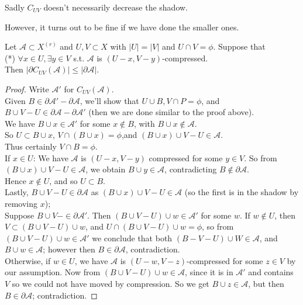 \documentclass[a4paper]{article}
\begin{document}
Sadly $C_{UV}$ doesn't necessarily decrease the shadow.

However, it turns out to be fine if we have done the smaller ones.

\begin{prop}
    Let $\mathcal{A} \subset X^{(r)}$ and $U,V \subset X$ with $|U|=|V|$ and $U \cap V = \phi$. Suppose that\\
    (*) $\forall x \in U, \exists y \in V$ s.t. $\mathcal{A}$ is $(U-x,V-y)$-compressed.\\
    Then $|\partial C_{UV}(\mathcal{A})|\leq |\partial \mathcal{A}|$.
    \begin{proof}
        Write $\mathcal{A}'$ for $C_{UV}(\mathcal{A})$.\\
        Given $B \in \partial \mathcal{A}' - \partial \mathcal{A}$, we'll show that $U \cup B, V \cap P = \phi$, and $B \cup V - U \in \partial \mathcal{A} - \partial \mathcal{A}'$ (then we are done similar to the proof above).\\
        We have $B \cup x \in \mathcal{A}'$ for some $x \not\in B$, with $B \cup x \not\in \mathcal{A}$.\\
        So $U \subset B \cup x$, $V \cap (B \cup x) = \phi$,and $(B \cup x) \cup V - U \in \mathcal{A}$.\\
        Thus certainly $V \cap B = \phi$.\\
        If $x \in U$: We have $\mathcal{A}$ is $(U-x,V-y)$ compressed for some $y \in V$. So from $(B \cup x) \cup V - U \in \mathcal{A}$, we obtain $B \cup y \in \mathcal{A}$, contradicting $B \not\in \partial \mathcal{A}$.\\
        Hence $x \not\in U$, and so $U \subset B$.\\
        Lastly, $B \cup V - U \in \partial \mathcal{A}$ as $(B \cup x) \cup V - U \in \mathcal{A}$ (so the first is in the shadow by removing $x$);\\
        Suppose $B \cup V- \in \partial \mathcal{A}'$. Then $(B \cup V - U) \cup w \in \mathcal{A}'$ for some $w$. If $w \not\in U$, then $V \subset (B \cup V - U) \cup w$, and $U \cap (B\cup V-U) \cup w = \phi$, so from $(B\cup V - U) \cup w \in \mathcal{A}'$ we conclude that both $(B-V-U) \cup W \in \mathcal{A}$, and $B \cup w \in \mathcal{A}$; however then $B \in \partial \mathcal{A}$, contradiction.\\
        Otherwise, if $w \in U$, we have $\mathcal{A}$ is $(U-w,V-z)$-compressed for some $z \in V$ by our assumption. Now from $(B \cup V-U) \cup w \in\mathcal{A}$, since it is in $\mathcal{A}'$ and contains $V$ so we could not have moved by compression. So we get $B \cup z \in \mathcal{A}$, but then $B \in \partial \mathcal{A}$; contradiction.
    \end{proof}
\end{prop}
\end{document}
